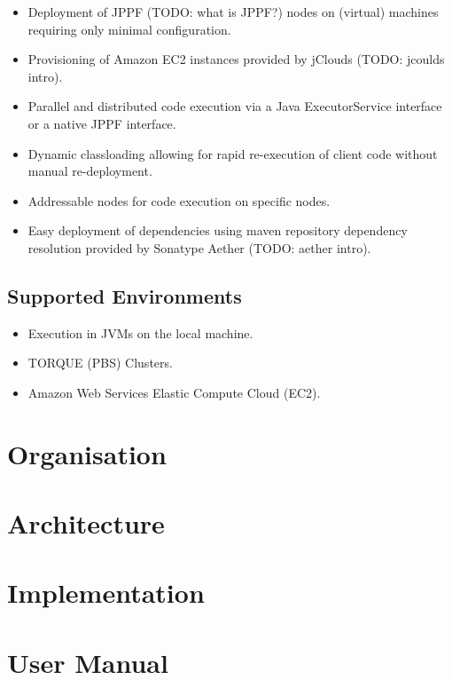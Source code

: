 \documentclass[english]{uzhpub}
\begin{document}
\begin{itemize}
\item Deployment of JPPF (TODO: what is JPPF?) nodes on (virtual) machines requiring only minimal configuration.
\item Provisioning of Amazon EC2 instances provided by jClouds (TODO: jcoulds intro).
\item Parallel and distributed code execution via a Java ExecutorService interface or a native JPPF interface.
\item Dynamic classloading allowing for rapid re-execution of client code without manual re-deployment.
\item Addressable nodes for code execution on specific nodes.
\item Easy deployment of dependencies using maven repository dependency resolution provided by Sonatype Aether (TODO: aether intro).
\end{itemize}

\subsection{Supported Environments}
\begin{itemize}
\item Execution in JVMs on the local machine.
\item TORQUE (PBS) Clusters.
\item Amazon Web Services Elastic Compute Cloud (EC2).
\end{itemize}

\section{Organisation}



\section{Architecture}



\section{Implementation}



\section{User Manual}

\end{document}
